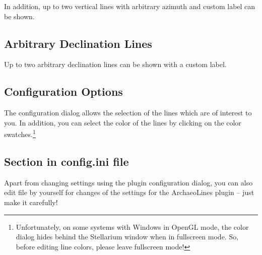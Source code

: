 In addition, up to two vertical lines with arbitrary azimuth and
custom label can be shown.


\subsection{Arbitrary Declination Lines}
\label{sec:plugin:ArchaeoLines:Declinations:arbitrary}

Up to two arbitrary declination lines can be shown with a custom label. 

\subsection{Configuration Options}
\label{sec:plugin:ArchaeoLines:configuration}

The configuration dialog allows the selection of the lines which are
of interest to you. 
%
%
In addition, you can select the color of the lines by clicking on the
color swatches.\footnote{Unfortunately, on some systems with Windows in OpenGL mode, the color dialog hides
behind the Stellarium window when in fullscreen mode. So, before
editing line colors, please leave fullscreen mode!}

\subsection*{Section  in config.ini file}

Apart from changing settings using the plugin configuration dialog,
you can also edit  file by yourself for changes of the
settings for the ArchaeoLines plugin -- just make it carefully!

